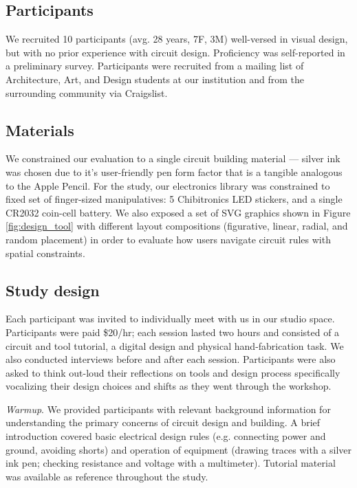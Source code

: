 \documentclass{sigchi}
\begin{document}
\subsection{Participants}
    We recruited 10 participants (avg. 28 years, 7F, 3M) well-versed in visual design, but with no prior experience with circuit design. Proficiency was self-reported in a preliminary survey. Participants were recruited from a mailing list of Architecture, Art, and Design students at our institution and from the surrounding community via Craigslist.

\subsection{Materials}
    We constrained our evaluation to a single circuit building material --- silver ink was chosen due to it's user-friendly pen form factor that is a tangible analogous to the Apple Pencil. For the study, our electronics library was constrained to fixed set of finger-sized manipulatives: 5 Chibitronics LED stickers, and a single CR2032 coin-cell battery. We also exposed a set of SVG graphics shown in Figure \ref{fig:design_tool} with different layout compositions (figurative, linear, radial, and random placement) in order to evaluate how users navigate circuit rules with spatial constraints. 

\subsection{Study design}
    Each participant was invited to individually meet with us in our studio space. Participants were paid \$20/hr; each session lasted two hours and consisted of a circuit and tool tutorial, a digital design and physical hand-fabrication task. We also conducted interviews before and after each session. Participants were also asked to think out-loud their reflections on tools and design process specifically vocalizing their design choices and shifts as they went through the workshop. 

    \textit{Warmup}. We provided participants with relevant background information for understanding the primary concerns of circuit design and building. A brief introduction covered basic electrical design rules (e.g. connecting power and ground, avoiding shorts) and operation of equipment (drawing traces with a silver ink pen; checking resistance and voltage with a multimeter). Tutorial material was available as reference throughout the study. 
\end{document}
